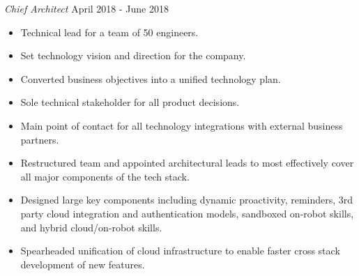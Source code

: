 \documentclass[a4paper]{article}
\begin{document}
\begin{addmargin}[1em]{0em}
    \textit{Chief Architect} \hfill April 2018 - June 2018\\
    \vspace{-1mm}
    \begin{itemize} \itemsep 1pt
        \item Technical lead for a team of 50 engineers.
        \item Set technology vision and direction for the company.
        \item Converted business objectives into a unified technology plan.
        \item Sole technical stakeholder for all product decisions.
        \item Main point of contact for all technology integrations with external
            business partners.
        \item Restructured team and appointed architectural leads to most effectively
            cover all major components of the tech stack.
        \item Designed large key components including dynamic proactivity, reminders,
            3rd party cloud integration and authentication models, sandboxed on-robot
            skills, and hybrid cloud/on-robot skills.
        \item Spearheaded unification of cloud infrastructure to enable faster cross stack
            development of new features.
        

\end{itemize}
\end{addmargin}
\end{document}
